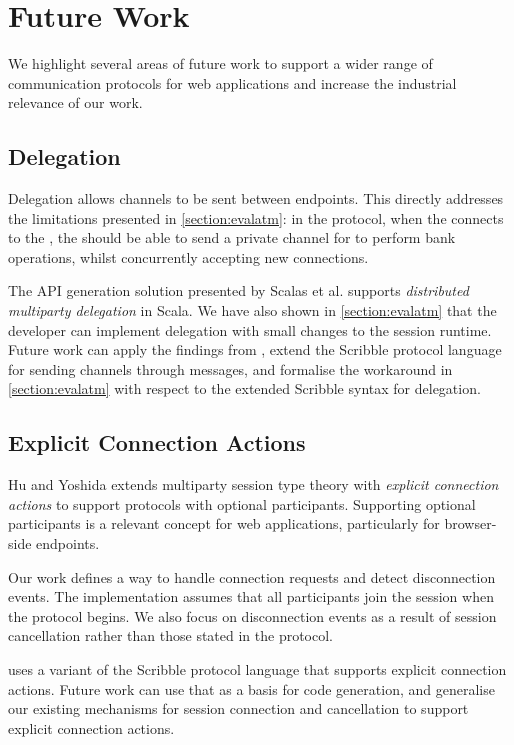\section{Future Work}

We highlight several areas of future work
to support a wider range of communication protocols
for web applications and increase the 
industrial relevance of our work.

\subsection{Delegation}
Delegation allows channels to be sent between endpoints.
This directly addresses the limitations presented in
\cref{section:evalatm}: in the  protocol,
when the 
connects to the ,
the  should be able to send a private channel
for  to perform bank operations,
whilst concurrently accepting new connections.

The API generation solution 
presented by Scalas et al. \cite{LinearDecomp} supports
\textit{distributed multiparty delegation} in Scala.
We have also shown in \cref{section:evalatm} that
the developer can implement delegation with small changes
to the session runtime.
Future work can apply the findings from \cite{LinearDecomp},
extend the Scribble protocol language for sending
channels through messages, and formalise the workaround
in \cref{section:evalatm} with respect to the extended 
Scribble syntax for delegation.

\subsection{Explicit Connection Actions}
Hu and Yoshida \cite{ExplicitConnections} extends 
multiparty session type theory
with \textit{explicit connection actions} to support protocols 
with optional participants.
Supporting optional participants is a relevant concept
for web applications, particularly for browser-side endpoints.

Our work defines a way to handle connection requests
and detect disconnection events. The implementation assumes that
all participants join the session when the protocol begins.
We also focus on disconnection events as a result of session
cancellation rather than those stated in the protocol.

\cite{ExplicitConnections} uses a variant of the Scribble protocol
language that supports explicit connection actions. Future work
can use that as a basis for code generation, and generalise
our existing mechanisms for session connection and cancellation
to support explicit connection actions.

